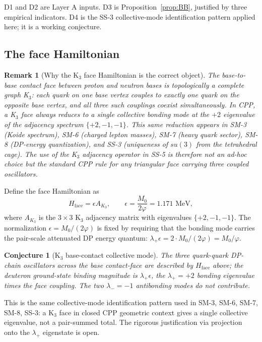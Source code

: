 \documentclass[11pt,letterpaper]{article}
\newtheorem{conjecture}[theorem]{Conjecture}
\newtheorem{remark}[theorem]{Remark}
\newcommand{\phig}{\varphi}
\newcommand{\Mzero}{M_0}
\begin{document}
D1 and D2 are Layer A inputs. D3 is Proposition~\ref{prop:BB}, justified by three empirical indicators. D4 is the SS-3 collective-mode identification pattern applied here; it is a working conjecture.

\subsection{The face Hamiltonian}

\begin{remark}[Why the K$_3$ face Hamiltonian is the correct object]
The base-to-base contact face between proton and neutron bases is topologically a complete graph K$_3$: each quark on one base vertex couples to exactly one quark on the opposite base vertex, and all three such couplings coexist simultaneously. In CPP, a K$_3$ face always reduces to a single collective bonding mode at the $+2$ eigenvalue of the adjacency spectrum $\{+2, -1, -1\}$. This same reduction appears in SM-3 (Koide spectrum), SM-6 (charged lepton masses), SM-7 (heavy quark sector), SM-8 (DP-energy quantization), and SS-3 (uniqueness of $su(3)$ from the tetrahedral cage). The use of the K$_3$ adjacency operator in SS-5 is therefore not an ad-hoc choice but the standard CPP rule for any triangular face carrying three coupled oscillators.
\end{remark}

Define the face Hamiltonian as
\begin{equation}
H_{\mathrm{face}} = \epsilon A_{K_3}, \qquad \epsilon = \frac{\Mzero}{2\phig} = 1.171 \text{ MeV},
\label{eq:Hface}
\end{equation}
where $A_{K_3}$ is the $3 \times 3$ K$_3$ adjacency matrix with eigenvalues $\{+2, -1, -1\}$. The normalization $\epsilon = \Mzero/(2\phig)$ is fixed by requiring that the bonding mode carries the pair-scale attenuated DP energy quantum: $\lambda_+ \epsilon = 2 \cdot \Mzero/(2\phig) = \Mzero/\phig$.

\begin{conjecture}[K$_3$ base-contact collective mode]
\label{conj:K3_deuteron}
The three quark-quark DP-chain oscillators across the base contact-face are described by $H_{\mathrm{face}}$ above; the deuteron ground-state binding magnitude is $\lambda_+ \epsilon$, the $\lambda_+ = +2$ bonding eigenvalue times the face coupling. The two $\lambda_- = -1$ antibonding modes do not contribute.
\end{conjecture}

This is the same collective-mode identification pattern used in SM-3, SM-6, SM-7, SM-8, SS-3: a K$_3$ face in closed CPP geometric context gives a single collective eigenvalue, not a pair-summed total. The rigorous justification via projection onto the $\lambda_+$ eigenstate is open.
\end{document}
